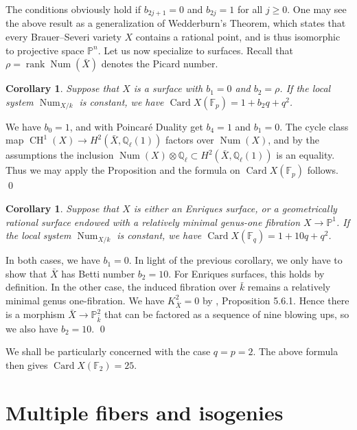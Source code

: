 \documentclass[oneside, 12pt]{amsart}
\newcommand\mylabel[1]{\label{#1}\marginpar{\vspace{-1ex}\medskip\medskip\footnotesize \tt #1}}
\renewcommand\mylabel[1]{\label{#1}}
\newtheorem{corollary}[theorem]{Corollary}
\theoremstyle{definition}
\theoremstyle{remark}
\newcommand{\QQ}{\mathbb{Q}}
\newcommand{\FF}{\mathbb{F}}
\newcommand{\PP}{\mathbb{P}}
\newcommand{\Card}{\operatorname{Card}}
\newcommand{\CH}{\operatorname{CH}}
\newcommand{\Num}{\operatorname{Num}}
\newcommand{\ra}{\rightarrow}
\newcommand{\rank}{\operatorname{rank}}
\newcommand{\bk}{{\bar{k}}}
\newcommand{\bX}{{\bar{X}}}
\begin{document}
\medskip
The conditions obviously hold if $b_{2j+1}=0$ and $b_{2j}=1$ for all $j\geq 0$. One may see the above result
as a generalization of  Wedderburn's Theorem, which states that every Brauer--Severi variety $X$ contains a rational point, 
and is thus isomorphic to   projective  space $\PP^n$. 
Let us now specialize to surfaces. Recall that $\rho=\rank \Num(\bX)$ denotes the Picard number.

\begin{corollary}
Suppose that $X$ is a surface with $b_1=0$ and $b_2=\rho$.
If the local system $\Num_{X/k}$ is constant, we have $\Card X(\FF_p)= 1+b_2q+q^2$. 
\end{corollary}

\proof
We have $b_0=1$, and with Poincar\'e Duality get $b_4=1$ and $b_1=0$. The cycle class map $\CH^1(X)\ra H^2(\bX,\QQ_\ell(1))$
factors over $\Num(X)$, and  by the assumptions  the inclusion $\Num(X)\otimes\QQ_\ell\subset H^2(\bX,\QQ_\ell(1))$ is an equality.
Thus we may apply the  Proposition and  the formula on  $\Card X(\FF_p)$ follows.
\qed

\begin{corollary}
\mylabel{points on enriques}
Suppose that $X$ is either an Enriques surface, or a  geometrically rational   surface endowed
with a relatively minimal genus-one fibration $X\ra\PP^1$. If the local system $\Num_{X/k}$ is constant,
we have  $\Card X(\FF_q) = 1+10q+q^2$.
\end{corollary}

\proof
In both cases, we have $b_1=0$. 
In light of the previous corollary, we only have to show
that $\bX$ has Betti number $b_2=10$. For Enriques surfaces, this holds by definition.
In the other case, the induced  fibration over $\bk$ remains a relatively minimal genus one-fibration.
We have $K_{\bX}^2=0$ by \cite{Cossec; Dolgachev 1989}, Proposition 5.6.1.
Hence there is a morphism $\bX\ra\PP^2_\bk$ that can be factored as a sequence of nine blowing ups,
so we also have $b_2=10$.   
\qed

\medskip
We shall be particularly concerned with the case $q=p=2$. The above formula then gives $\Card X(\FF_2)=25$.


\section{Multiple fibers and isogenies}
\mylabel{Multiple fibers}
\end{document}

